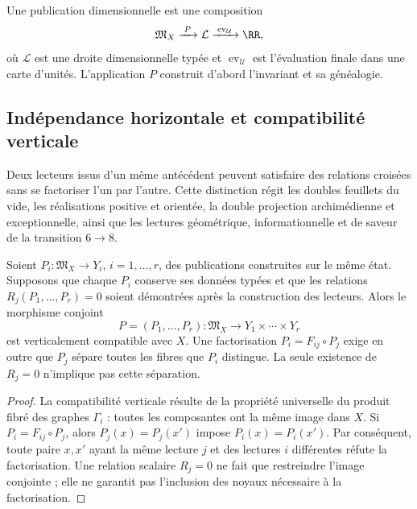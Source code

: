 \begin{definition}
Une publication dimensionnelle est une composition
\begin{equation}
 \mathfrak M_X\xrightarrow{\;P\;}\mathcal L
 \xrightarrow{\;\operatorname{ev}_{\mathcal U}\;}\RR,
 \label{rm:eq:dimensional-publication}
\end{equation}
où \(\mathcal L\) est une droite dimensionnelle typée et \(\operatorname{ev}_{\mathcal U}\) est l’évaluation finale dans une carte d’unités. L’application \(P\) construit d’abord l’invariant et sa généalogie.
\end{definition}

\subsection{Indépendance horizontale et compatibilité verticale}

Deux lecteurs issus d’un même antécédent peuvent satisfaire des relations croisées sans se factoriser l’un par l’autre. Cette distinction régit les doubles feuillets du vide, les réalisations positive et orientée, la double projection archimédienne et exceptionnelle, ainsi que les lectures géométrique, informationnelle et de saveur de la transition \(6\to8\).

\begin{theorem}
Soient \(P_i:\mathfrak M_X\to Y_i\), \(i=1,\ldots,r\), des publications construites sur le même état. Supposons que chaque \(P_i\) conserve ses données typées et que les relations \(R_j(P_1,\ldots,P_r)=0\) soient démontrées après la construction des lecteurs. Alors le morphisme conjoint
\begin{equation}
 P=(P_1,\ldots,P_r):\mathfrak M_X\longrightarrow
 Y_1\times\cdots\times Y_r
 \label{rm:eq:joint-publication}
\end{equation}
est verticalement compatible avec \(X\). Une factorisation \(P_i=F_{ij}\circ P_j\) exige en outre que \(P_j\) sépare toutes les fibres que \(P_i\) distingue. La seule existence de \(R_j=0\) n’implique pas cette séparation.
\end{theorem}

\begin{proof}
La compatibilité verticale résulte de la propriété universelle du produit fibré des graphes \(\Gamma_i\) : toutes les composantes ont la même image dans \(X\). Si \(P_i=F_{ij}\circ P_j\), alors \(P_j(x)=P_j(x')\) impose \(P_i(x)=P_i(x')\). Par conséquent, toute paire \(x,x'\) ayant la même lecture \(j\) et des lectures \(i\) différentes réfute la factorisation. Une relation scalaire \(R_j=0\) ne fait que restreindre l’image conjointe ; elle ne garantit pas l’inclusion des noyaux nécessaire à la factorisation.
\end{proof}


